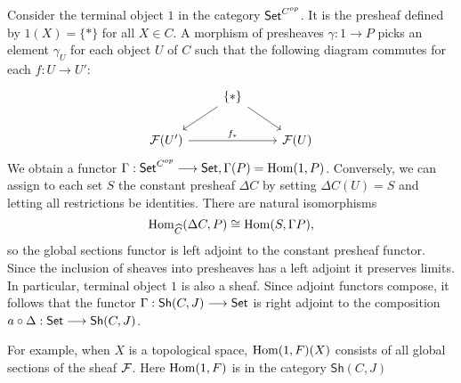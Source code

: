 Consider the terminal object $1$ in the category $\mathsf{Set}^{C^{op}}$. It is the presheaf defined by $1(X) = \{*\}$ for all $X \in C$. A morphism of presheaves $\gamma: 1 \to P$ picks an element $\gamma_U$ for each object $U$ of $C$ such that the following diagram commutes for each $f: U \to U'$:
\[ \begin{tikzcd}
	& {\{*\}} \\
	{\Sh{F}(U')} && {\Sh{F}(U)}
	\arrow[from=1-2, to=2-1]
	\arrow["{f_*}", from=2-1, to=2-3]
	\arrow[from=1-2, to=2-3]
\end{tikzcd}
\]
We obtain a functor $\Gamma: \mathsf{Set}^{C^{op}} \longrightarrow \mathsf{Set}, \Gamma(P) = \operatorname{Hom}(1, P)$. Conversely, we can assign to each set $S$ the constant presheaf $\Delta C$ by setting $\Delta C(U) = S$ and letting all restrictions be identities. There are natural isomorphisms
\[\operatorname{Hom}_{\widehat{C}}(\Delta C, P) \cong \operatorname{Hom}(S, \Gamma P),\]
so the global sections functor is left adjoint to the constant presheaf functor.
Since the inclusion of sheaves into presheaves has a left adjoint it preserves limits. In particular, terminal object $1$ is also a sheaf. Since adjoint functors compose, it follows that the functor $\Gamma : \mathsf{Sh}(C,J) \longrightarrow \mathsf{Set}$ is right adjoint to the composition $a \circ \Delta: \mathsf{Set} \longrightarrow \mathsf{Sh}(C,J)$. 


For example, when $X$ is a topological space, $\operatorname{Hom}(1,F)(X)$ consists of all global sections of the sheaf $\mathcal{F}$. Here $\operatorname{Hom}(1,F)$ is in the category $\mathsf{Sh}(C,J)$